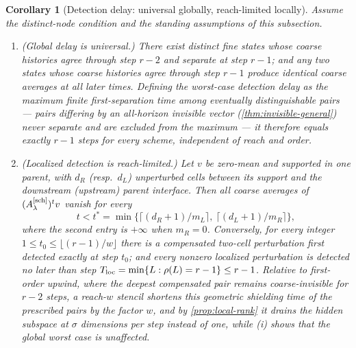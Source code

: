 \documentclass[pdflatex,sn-mathphys-num]{sn-jnl}%
\theoremstyle{thmstyleone}%
\newtheorem{corollary}{Corollary}%
\theoremstyle{thmstyletwo}%
\theoremstyle{thmstylethree}%
\newcommand{\Asch}{A^{[\rm sch]}_\lambda}
\begin{document}
\begin{corollary}[Detection delay: universal globally, reach-limited locally]\label{cor:detection-delay}
Assume the distinct-node condition and the standing assumptions of this subsection.
\begin{enumerate}
\item[(i)] (\emph{Global delay is universal.})
      There exist distinct fine states whose coarse histories agree through step $r-2$ and separate at step $r-1$; and any two states whose coarse histories agree through step $r-1$ produce identical coarse averages at \emph{all} later times.
      Defining the worst-case detection delay as the maximum \emph{finite} first-separation time among eventually distinguishable pairs --- pairs differing by an all-horizon invisible vector (\cref{thm:invisible-general}) never separate and are excluded from the maximum --- it therefore equals exactly $r-1$ steps for every scheme, independent of reach and order.
\item[(ii)] (\emph{Localized detection is reach-limited.})
      Let $v$ be zero-mean and supported in one parent, with $d_R$ (resp.\ $d_L$) unperturbed cells between its support and the downstream (upstream) parent interface.
      Then all coarse averages of $(\Asch)^tv$ vanish for every \[ t<t^\ast = \min\bigl\{ \lceil (d_R+1)/m_L\rceil,\ \lceil (d_L+1)/m_R\rceil \bigr\}, \] where the second entry is $+\infty$ when $m_R=0$.
      Conversely, for every integer $1\le t_0\le\lfloor(r-1)/w\rfloor$ there is a compensated two-cell perturbation first detected exactly at step $t_0$; and every nonzero localized perturbation is detected no later than step $T_{\rm loc}=\min\{L:\rho(L)=r-1\}\le r-1$.
      Relative to first-order upwind, where the deepest compensated pair remains coarse-invisible for $r-2$ steps, a reach-$w$ stencil shortens this \emph{geometric shielding time} of the prescribed pairs by the factor $w$, and by \cref{prop:local-rank} it drains the hidden subspace at $\sigma$ dimensions per step instead of one, while (i) shows that the global worst case is unaffected.
\end{enumerate}
\end{corollary}
\end{document}
